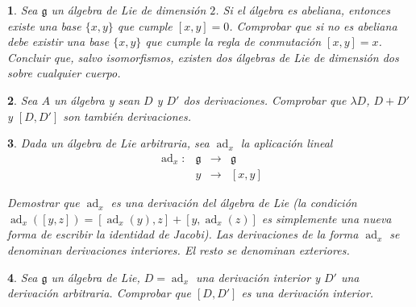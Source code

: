 \documentclass[a4paper,draft,12pt]{scrartcl}
\newtheorem{pro1}{}%
\newenvironment{pro}{\begin{pro1} \rm} {\end{pro1}}
\newcommand{\g}{\mathfrak{g}}%
\newcommand{\lto}{\longrightarrow}%
\newcommand{\df}[1]{\textsf{\color{blue}#1}}
\DeclareMathOperator{\ad}{ad}  %
\begin{document}
\begin{pro}

Sea $\g$ un álgebra de Lie de dimensión $2$.  Si el álgebra es abeliana, entonces existe una base $\{x,y\}$ que cumple $[x,y]=0$.  Comprobar que si no es abeliana debe existir una base $\{x,y\}$ que cumple la regla de conmutación $[x,y]=x$.  Concluir que, salvo isomorfismos, existen dos álgebras de Lie de dimensión dos sobre cualquier cuerpo.

\end{pro}

\begin{pro}

Sea $A$ un álgebra y sean $D$ y $D'$ dos derivaciones. Comprobar que $\lambda D$, $D+D'$ y $[D,D']$ son también derivaciones.

\end{pro}

\begin{pro}

Dada un álgebra de Lie arbitraria, sea $\ad_x$ la aplicación lineal 
\[
\begin{array}{lccc}
\ad_x: & \g & \lto &\g \\
    & y& \lto & [x,y]
\end{array}
\]

Demostrar que $\ad_x$ es una derivación del álgebra de Lie (la condición $\ad_x([y,z])=[\ad_x (y), z]+[y,\ad_x (z)]$ es simplemente una nueva forma de escribir la identidad de Jacobi). Las derivaciones de la forma $\ad_x$ se denominan   \df{derivaciones interiores}.  El resto se denominan   \df{exteriores}. 

\end{pro}

\begin{pro}

Sea $\g$ un álgebra de Lie, $D=\ad_x$ una derivación interior y $D'$ una derivación arbitraria. Comprobar que $[D,D']$ es una derivación interior. 

\end{pro}
\end{document}

